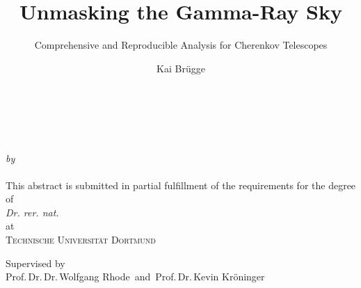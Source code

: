 \documentclass[paper=a4,oneside, DIV=13]{scrbook}
\title{Unmasking the Gamma-Ray Sky}
\subtitle{Comprehensive and Reproducible Analysis for Cherenkov Telescopes}
\author{Kai Brügge}
\begin{document}
\begin{titlepage}
    \makeatletter
    \begin{center}
    {%
      \begin{Huge}%
        \@title
      \end{Huge}\\[0.2cm]
      \begin{Large}
        \@subtitle
      \end{Large}\\
      \emph{by}\\
      \@author\\
      \vspace{0.8cm}
      This abstract is submitted in partial fulfillment
      of the requirements for the degree of\\
      \emph{Dr. rer. nat.}\\
      at\\
      \textsc{Technische Universität Dortmund}
      
      \vspace{1.cm}
      Supervised by \\
    Prof.\,Dr.\,Dr.\,Wolfgang Rhode\,  and\,   Prof.\,Dr.\,Kevin Kröninger

    \par}

    \end{center}
    
    

    \makeatother
  \end{titlepage}
\end{document}
